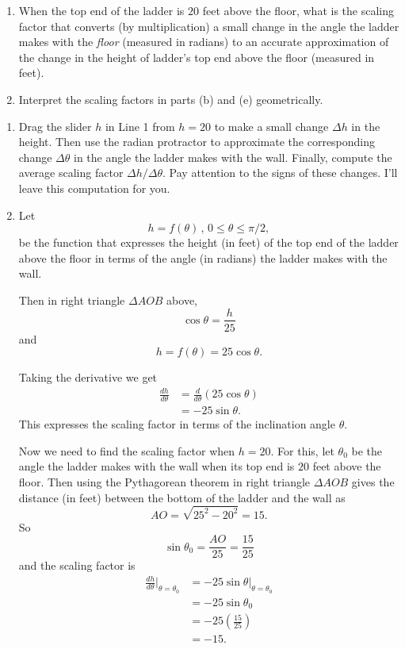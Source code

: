 \documentclass{ximera}
\begin{document}
\begin{question}
\begin{enumerate}
\item When the top end of the ladder is $20$ feet above the floor, what is the scaling factor that converts (by multiplication) a small change in the angle the ladder makes with the \emph{floor} (measured in radians)  to an accurate approximation of the change in the height of ladder's top end above the floor (measured in feet).  

\item Interpret the scaling factors in parts (b) and (e) geometrically.
\end{enumerate}

\begin{explanation}
\begin{enumerate}
\item Drag the slider $h$ in Line 1 from $h=20$ to make a small change $\Delta h$ in the height. Then use the radian protractor to approximate the corresponding change $\Delta \theta$ in the angle the ladder makes with the wall. Finally, compute the average scaling factor $\Delta h/\Delta \theta$. Pay attention to the signs of these changes. I'll leave this computation for you. 

\item  Let 
\[
 h = f(\theta) \, , \, 0\leq \theta \leq \pi/2,
\]
be the function that expresses the height (in feet) of the top end of the ladder above the floor in terms of the angle (in radians) the ladder makes with the wall.

Then in right triangle $\Delta AOB$ above,
\[
  \cos\theta = \frac{h}{25}
\]
and
\[
 h = f(\theta) = 25\cos\theta.
\]

Taking the derivative we get
\begin{align*}
   \frac{dh}{d\theta} &= \frac{d}{d\theta} \left( 25\cos\theta \right)  \\
                              &= -25 \sin\theta .
\end{align*}
This expresses the scaling factor in terms of the inclination angle $\theta$. 

Now we need to find the scaling factor when $h=20$. For this, let $\theta_0$ be the angle the ladder makes with the wall when its top end is $20$ feet above the floor. Then using the Pythagorean theorem in right triangle $\Delta AOB$ gives the distance (in feet) between the bottom of the ladder and the wall as
\[
       AO = \sqrt{25^2 - 20^2} = 15.
\]
So 
\[
  \sin\theta_0 = \frac{AO}{25} = \frac{15}{25}
\]
and the scaling factor is
\begin{align*}
    \frac{dh}{d\theta}\Big|_{\theta = \theta_0}  &= -25 \sin\theta \Big|_{\theta = \theta_0}  \\
                                                        &= -25\sin\theta_0 \\
                                                        &= -25\left( \frac{15}{25} \right) \\
                                                        &= -15 .
\end{align*}


\end{enumerate}
\end{explanation}
\end{question}
\end{document}
